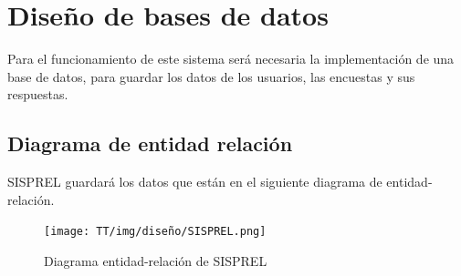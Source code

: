 

\section{Diseño de bases de datos}
Para el funcionamiento de este sistema será necesaria la implementación de una base de datos, para guardar los datos de los usuarios, las encuestas y sus respuestas.

\subsection{Diagrama de entidad relación}
SISPREL guardará los datos que están en el siguiente diagrama de entidad-relación.

\begin{figure}[!ht]
    \centering
    \texttt{[image: TT/img/diseño/SISPREL.png]}
    \caption{Diagrama entidad-relación de SISPREL}
    \label{graphic:entidad-relación}
\end{figure}


